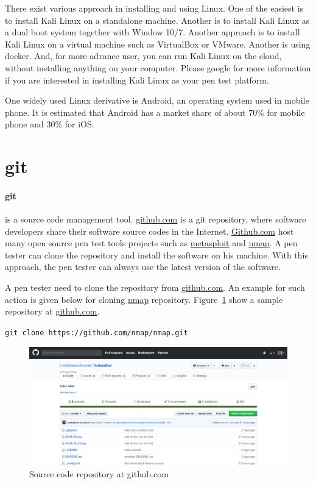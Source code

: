 \documentclass[7x9]{times}
\begin{document}
There exist various approach in installing and using Linux.
One of the easiest is to install Kali Linux on a standalone
machine. Another is to install Kali Linux as a dual boot
system together with Window 10/7. Another approach is to
install Kali Linux on a virtual machine such as VirtualBox
or VMware. Another is using docker. And, for more advance
user, you can run Kali Linux on the cloud, without
installing anything on your computer. Please google for more
information if you are interested in installing Kali Linux
as your pen test platform.



One widely used Linux derivative is Android, an operating
system used in mobile phone. It is estimated that Android
has a market share of about 70\% for mobile phone and 30\%
for iOS.



\section{git}

\paragraph{git}\cite{loeliger2012} is a source code
management tool. \url{github.com} is a git repository, where
software developers share their software source codes in the
Internet. \url{Github.com} host many open source pen test
tools projects such as \url{metasploit} and \url{nmap}. A
pen tester can clone the repository and install the software
on his machine. With this approach, the pen tester can
always use the latest version of the software.

A pen tester need to clone the repository from
\url{github.com}. An example for such action is given below
for cloning \url{nmap} repository. Figure~\ref{fig:github}
show a sample repository at \url{github.com}.


\verb|git clone https://github.com/nmap/nmap.git|



\begin{figure}
\centering
\includegraphics[width=.75\textwidth]{github-ui}
\caption{Source code repository at github.com}
\label{fig:github}
\end{figure}
\end{document}
